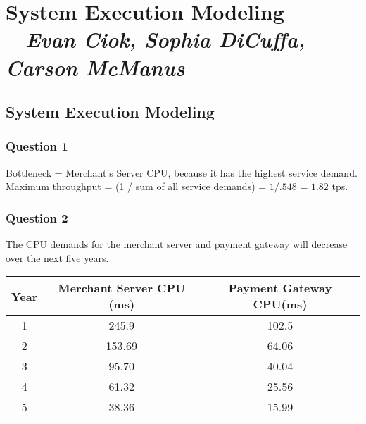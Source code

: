 \chapter{System Execution Modeling \\
  \small{\textit{-- Evan Ciok, Sophia DiCuffa, Carson McManus}}
  \label{Chapter::LabThree}}


\section{System Execution Modeling \label{Section::LabThree}}

\subsection{Question 1}
Bottleneck = Merchant’s Server CPU, because it has the highest service demand.
Maximum throughput = (1 / sum of all service demands) = $1/.548$ = $1.82$ tps.

\subsection{Question 2}
The CPU demands for the merchant server and payment gateway will decrease over the next five years.
\begin{center}
  \begin{tabular}{ |c|c|c| }
    \hline
    Year & Merchant Server CPU (ms) & Payment Gateway CPU(ms) \\
    \hline
    1    & 245.9                    & 102.5                   \\
    \hline
    2    & 153.69                   & 64.06                   \\
    \hline
    3    & 95.70                    & 40.04                   \\
    \hline
    4    & 61.32                    & 25.56                   \\
    \hline
    5    & 38.36                    & 15.99                   \\
    \hline
  \end{tabular}
\end{center}

